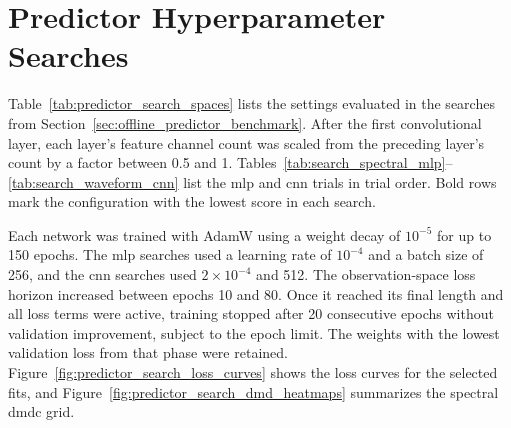 \chapter{Predictor Hyperparameter Searches}\label{app:predictor_search}

Table~\ref{tab:predictor_search_spaces} lists the settings evaluated in the searches from Section~\ref{sec:offline_predictor_benchmark}.
After the first convolutional layer, each layer's feature channel count was scaled from the preceding layer's count by a factor between 0.5 and 1.
Tables~\ref{tab:search_spectral_mlp}--\ref{tab:search_waveform_cnn} list the \ac{mlp} and \ac{cnn} trials in trial order.
Bold rows mark the configuration with the lowest score in each search.

Each network was trained with AdamW using a weight decay of $10^{-5}$ for up to 150 epochs.
The \ac{mlp} searches used a learning rate of $10^{-4}$ and a batch size of 256, and the \ac{cnn} searches used $2\times10^{-4}$ and 512.
The observation-space loss horizon increased between epochs 10 and 80.
Once it reached its final length and all loss terms were active, training stopped after 20 consecutive epochs without validation improvement, subject to the epoch limit.
The weights with the lowest validation loss from that phase were retained.
Figure~\ref{fig:predictor_search_loss_curves} shows the loss curves for the selected fits, and Figure~\ref{fig:predictor_search_dmd_heatmaps} summarizes the spectral \ac{dmdc} grid.

